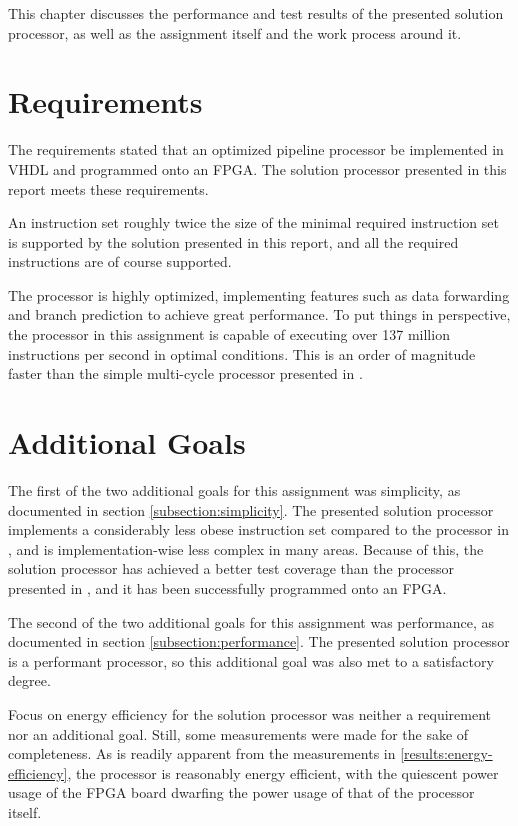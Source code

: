 This chapter discusses the performance and test results of the presented solution processor, as well as the assignment itself and the work process around it.

\section{Requirements}

The requirements stated that an optimized pipeline processor be implemented in VHDL and programmed onto an FPGA.
The solution processor presented in this report meets these requirements.

An instruction set roughly twice the size of the minimal required instruction set is supported by the solution presented in this report, and all the required instructions are of course supported.

The processor is highly optimized, implementing features such as data forwarding and branch prediction to achieve great performance.
To put things in perspective, the processor in this assignment is capable of executing over 137 million instructions per second in optimal conditions.
This is an order of magnitude faster than the simple multi-cycle processor presented in \cite{assignment-1}.

\section{Additional Goals}

The first of the two additional goals for this assignment was simplicity, as documented in section \vref{subsection:simplicity}.
The presented solution processor implements a considerably less obese instruction set compared to the processor in \cite{assignment-1}, and is implementation-wise less complex in many areas.
Because of this, the solution processor has achieved a better test coverage than the processor presented in \cite{assignment-1}, and it has been successfully programmed onto an FPGA.

The second of the two additional goals for this assignment was performance, as documented in section \vref{subsection:performance}.
The presented solution processor is a performant processor, so this additional goal was also met to a satisfactory degree.

Focus on energy efficiency for the solution processor was neither a requirement nor an additional goal.
Still, some measurements were made for the sake of completeness.
As is readily apparent from the measurements in \vref{results:energy-efficiency}, the processor is reasonably energy efficient, with the quiescent power usage of the FPGA board dwarfing the power usage of that of the processor itself.

